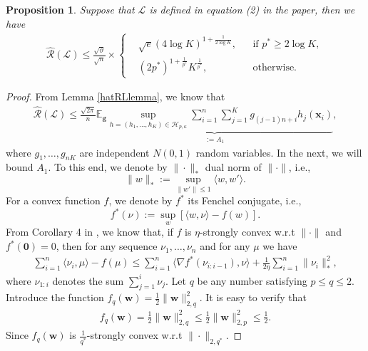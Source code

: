\documentclass{article}
\newtheorem{proposition}{Proposition}
\begin{document}
\begin{proposition}\cite{lei2015multi}
  \label{Lemma-empRad}
Suppose that $\mathcal{L}$ is defined in equation \textrm{(2)} in the paper,
then we have
  \begin{align*}
    \hat{\mathcal{R}}(\mathcal{L})\leq \frac{\sqrt{\vartheta}}{\sqrt{n}}\times
      \left\{
      \begin{aligned}
      &\sqrt{e}(4\log K)^{1+\frac{1}{2\log K}}, &&\text{if } p^\ast\geq 2\log K,\\
      &(2p^\ast)^{1+\frac{1}{p^\ast}}K^{\frac{1}{p^\ast}}, &&\text{otherwise.}
      \end{aligned}
      \right.
  \end{align*}
\end{proposition}
\begin{proof}
From Lemma \ref{hatRLlemma}, we know that
\begin{align}
\label{eq-middle-mi}
  \hat{\mathcal{R}}(\mathcal{L})\leq \frac{\sqrt{2\pi}}{n}\underbrace{\mathbb{E}_{\mathbf g}\sup_{h=(h_1,\ldots,h_K)
  \in\mathcal{H}_{p,\kappa}}\sum_{i=1}^n\sum_{j=1}^Kg_{(j-1)n+i}h_j(\mathbf x_i)}_{:=A_1},
\end{align}
  where $g_1,\ldots,g_{nK}$ are  independent $N(0,1)$ random variables.
  In the next, we will bound $A_1$.
  To this end,
 we denote by $\|\cdot\|_\ast$ dual norm of $\|\cdot\|$, i.e.,
$$\|w\|_\ast:=\sup_{\| w'\|\leq 1}\langle w, w'\rangle.$$
For a convex function $f$, we denote by $f^\ast$ its Fenchel
conjugate, i.e., $$f^\ast(\nu):=\sup_{w}\left[\langle w,\nu\rangle-f(w)\right].$$
  From Corollary 4 in \cite{Theodoros2000regularization}, we know that,
  if $f$ is $\eta$-strongly convex w.r.t $\|\cdot\|$ and $f^\ast(\mathbf 0)=0$, then for any sequence
  $\nu_1,\ldots,\nu_n$ and for any $\mu$ we have
  \begin{align*}
    \sum_{i=1}^n\langle \nu_i,\mu\rangle -f(\mu) \leq
    \sum_{i=1}^n\langle \nabla f^\ast(\nu_{i:i-1}),\nu\rangle +\frac{1}{2\eta}\sum_{i=1}^n\|\nu_i\|_\ast^2,
  \end{align*}
  where $\nu_{1:i}$ denotes the sum $\sum_{j=1}^i\nu_j$.
  Let $q$ be any number satisfying $p\leq q\leq 2$.
  Introduce the function $f_q(\mathbf w)=\frac{1}{2}\|\mathbf w\|_{2,q}^2$.
  It is easy to verify that
  \begin{align*}
    f_q(\mathbf w)=\frac{1}{2}\|\mathbf w\|_{2,q}^2\leq\frac{1}{2}\|\mathbf w\|_{2,p}^2\leq  \frac{1}{2}.
  \end{align*}
  Since  $f_q(\mathbf w)$ is $\frac{1}{q^\ast}$-strongly convex w.r.t  $\|\cdot\|_{2,q^\ast}$.

\end{proof}
\end{document}
